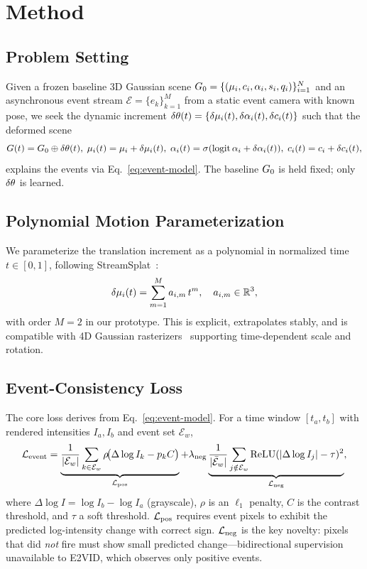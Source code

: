 \section{Method}
\label{sec:method}

\subsection{Problem Setting}
Given a frozen baseline 3D Gaussian scene $G_0 = \{(\mu_i, c_i, \alpha_i, s_i, q_i)\}_{i=1}^N$ and an asynchronous event stream $\mathcal{E}=\{e_k\}_{k=1}^M$ from a static event camera with known pose, we seek the dynamic increment $\delta\theta(t)=\{\delta\mu_i(t),\delta\alpha_i(t),\delta c_i(t)\}$ such that the deformed scene
\begin{equation}
  G(t) = G_0 \oplus \delta\theta(t),\;
  \mu_i(t)=\mu_i+\delta\mu_i(t),\;
  \alpha_i(t)=\sigma(\mathrm{logit}\,\alpha_i + \delta\alpha_i(t)),\;
  c_i(t)=c_i+\delta c_i(t),
  \label{eq:deform}
\end{equation}
explains the events via Eq.~\ref{eq:event-model}. The baseline $G_0$ is held fixed; only $\delta\theta$ is learned.

\subsection{Polynomial Motion Parameterization}
We parameterize the translation increment as a polynomial in normalized time $t\in[0,1]$, following StreamSplat~\cite{streamsplat2025}:
\begin{equation}
  \delta\mu_i(t) = \sum_{m=1}^{M} a_{i,m}\, t^m,\quad a_{i,m}\in\mathbb{R}^3,
  \label{eq:poly}
\end{equation}
with order $M{=}2$ in our prototype. This is explicit, extrapolates stably, and is compatible with 4D Gaussian rasterizers~\cite{wu20244dgs} supporting time-dependent scale and rotation.

\subsection{Event-Consistency Loss}
The core loss derives from Eq.~\ref{eq:event-model}. For a time window $[t_a,t_b]$ with rendered intensities $I_a, I_b$ and event set $\mathcal{E}_w$,
\begin{equation}
  \mathcal{L}_{\text{event}} = \underbrace{\frac{1}{|\mathcal{E}_w|}\sum_{k\in\mathcal{E}_w}
    \rho\!\big(\Delta\log I_k - p_k C\big)}_{\mathcal{L}_{\text{pos}}}
  + \lambda_{\text{neg}}\underbrace{\frac{1}{|\bar{\mathcal{E}}_w|}\sum_{j\notin\mathcal{E}_w}
    \mathrm{ReLU}(|\Delta\log I_j| - \tau)^2}_{\mathcal{L}_{\text{neg}}},
  \label{eq:event-loss}
\end{equation}
where $\Delta\log I = \log I_b - \log I_a$ (grayscale), $\rho$ is an $\ell_1$ penalty, $C$ is the contrast threshold, and $\tau$ a soft threshold. $\mathcal{L}_{\text{pos}}$ requires event pixels to exhibit the predicted log-intensity change with correct sign. $\mathcal{L}_{\text{neg}}$ is the key novelty: pixels that did \emph{not} fire must show small predicted change---bidirectional supervision unavailable to E2VID, which observes only positive events.

